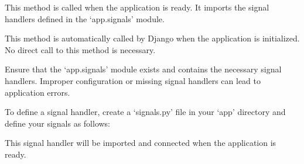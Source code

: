 \documentclass[letterpaper,10pt,english]{sphinxmanual}
\begin{document}
\begin{fulllineitems}

\begin{fulllineitems}
\label{\detokenize{app:app.apps.AppConfig.ready}}
\pysigstartsignatures
{}
\pysigstopsignatures
\sphinxAtStartPar
This method is called when the application is ready. It imports the
signal handlers defined in the ‘app.signals’ module.
\begin{description}
\sphinxAtStartPar
This method is automatically called by Django when the application is
initialized. No direct call to this method is necessary.

\sphinxAtStartPar
Ensure that the ‘app.signals’ module exists and contains the necessary
signal handlers. Improper configuration or missing signal handlers can
lead to application errors.

\sphinxAtStartPar
To define a signal handler, create a ‘signals.py’ file in your ‘app’
directory and define your signals as follows:

\begin{sphinxVerbatim}[commandchars=\\\{\}]
   
   
   

 
    
     
\end{sphinxVerbatim}

\sphinxAtStartPar
This signal handler will be imported and connected when the application
is ready.

\end{description}

\end{fulllineitems}


\end{fulllineitems}
\end{document}
